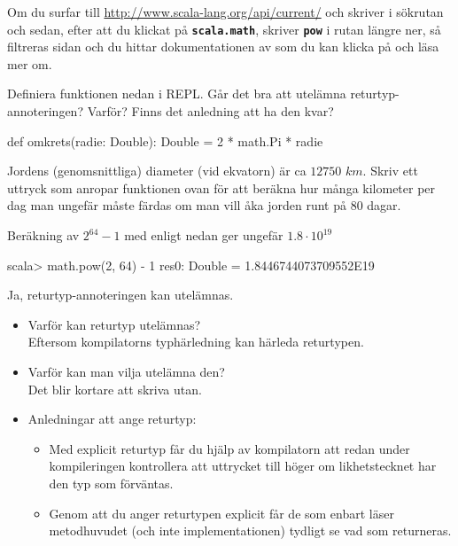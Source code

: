 Om du surfar till \url{http://www.scala-lang.org/api/current/} och skriver  i sökrutan och sedan, efter att du klickat på 
\textbf{\texttt{\small scala.math}}, skriver \textbf{\texttt{\small pow}} i rutan längre ner, så filtreras sidan och du hittar dokumentationen 
av  som du kan klicka på och läsa mer om.

\Subtask Definiera funktionen  nedan i REPL. Går det bra att utelämna returtyp-annoteringen? Varför? Finns det anledning att ha den kvar?
\begin{Code}
def omkrets(radie: Double): Double = 2 * math.Pi * radie
\end{Code}

\Subtask Jordens (genomsnittliga) diameter (vid ekvatorn) är ca $12 750$ $km$. Skriv ett uttryck som anropar funktionen  ovan för att beräkna hur många kilometer per dag man ungefär måste färdas om man vill åka jorden runt på 80 dagar.

\SOLUTION

\TaskSolved \what

\SubtaskSolved Beräkning av $2^{64} - 1$ med  enligt nedan ger ungefär $1.8 \cdot 10^{19}$
\begin{REPL}
scala> math.pow(2, 64) - 1
res0: Double = 1.8446744073709552E19
\end{REPL}

\SubtaskSolved Ja, returtyp-annoteringen  kan utelämnas.

\begin{itemize}
\item Varför kan returtyp utelämnas?\\Eftersom kompilatorns typhärledning kan härleda returtypen.
\item Varför kan man vilja utelämna den?\\Det blir kortare att skriva utan.
\item Anledningar att ange returtyp:
\begin{itemize}
\item  Med explicit returtyp får du hjälp av kompilatorn att redan under kompileringen kontrollera att uttrycket till höger om likhetstecknet har den typ som förväntas.

\item Genom att du anger returtypen explicit får de som enbart läser metodhuvudet (och inte implementationen)
 tydligt se vad som returneras.
\end{itemize}
\end{itemize}

